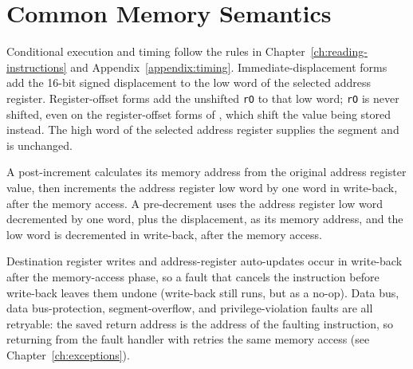 \section{Common Memory Semantics}

Conditional execution and timing follow the rules in Chapter~\ref{ch:reading-instructions} and
Appendix~\ref{appendix:timing}. Immediate-displacement forms add the 16-bit signed displacement to the low word of the
selected address register. Register-offset forms add the unshifted \texttt{rO} to that low word; \texttt{rO} is never
shifted, even on the register-offset forms of , which shift the value being stored instead. The high
word of the selected address register supplies the segment and is unchanged.

A post-increment  calculates its memory address from the original address register value, then
increments the address register low word by one word in write-back, after the memory access. A pre-decrement
 uses the address register low word decremented by one word, plus the displacement, as its memory
address, and the low word is decremented in write-back, after the memory access.

Destination register writes and address-register auto-updates occur in write-back after the memory-access phase, so a
fault that cancels the instruction before write-back leaves them undone (write-back still runs, but as a no-op). Data
bus, data bus-protection, segment-overflow, and privilege-violation faults are all retryable: the saved return address
is the address of the faulting instruction, so returning from the fault handler with  retries the same
memory access (see Chapter~\ref{ch:exceptions}).


